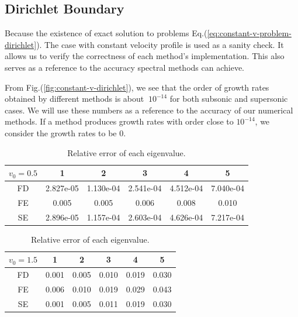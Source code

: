 \subsection{Dirichlet Boundary}
Because the existence of exact solution to problems Eq.(\ref{eq:constant-v-problem-dirichlet}). The case with constant velocity profile is used as a sanity check. It allows us to verify the correctness of each method's implementation. This also serves as a reference to the accuracy spectral methods can achieve.

From Fig.(\ref{fig:constant-v-dirichlet}), we see that the order of growth rates obtained by different methods is about $~10^{-14}$ for both subsonic and supersonic cases. We will use these numbers as a reference to the accuracy of our numerical methods. If a method produces growth rates with order close to $10^{-14}$, we consider the growth rates to be 0.

\begin{table} [H]
	\centering
	\caption{Relative error of each eigenvalue.}
	\begin{tabular}{|c|c|c|c|c|c|}
		\hline
		$v_0=0.5$   & 1 & 2 & 3 & 4 & 5 \\
		\hline
		FD & 2.827e-05 & 1.130e-04 & 2.541e-04 & 4.512e-04 & 7.040e-04 \\
		\hline
		FE & 0.005 & 0.005 & 0.006 & 0.008 & 0.010  \\
		\hline
		SE & 2.896e-05 & 1.157e-04 & 2.603e-04 & 4.626e-04 & 7.217e-04 \\
		\hline
	\end{tabular}
	\begin{tabular}{|c|c|c|c|c|c|}
		\hline
		$v_0=1.5$   & 1 & 2 & 3 & 4 & 5 \\
		\hline
		FD & 0.001 & 0.005 & 0.010 & 0.019 & 0.030 \\
		\hline
		FE & 0.006 & 0.010 & 0.019 & 0.029 & 0.043  \\
		\hline
		SE & 0.001 & 0.005 & 0.011 & 0.019 & 0.030 \\
		\hline
	\end{tabular}
	\label{table:eigenvalue-error-dirichlet}
\end{table}


